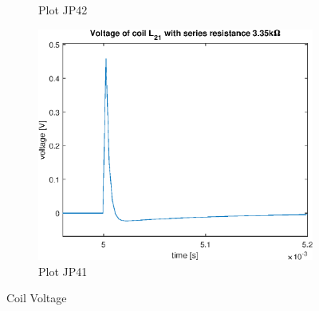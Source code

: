 \documentclass[notitlepage, a4paper, 11pt]{article}
\begin{document}
\begin{figure}[H]
\begin{subfigure}{0.45 \textwidth}
			\caption{Plot JP42}
		\end{subfigure}
		\hfill
		\begin{subfigure}{0.45 \textwidth}
			\includegraphics[width=\textwidth]{../Matlab/img/CircuitC1}
			\caption{Plot JP41}
		\end{subfigure}
		\caption{Coil Voltage}
	\end{figure}
	
\end{document}
